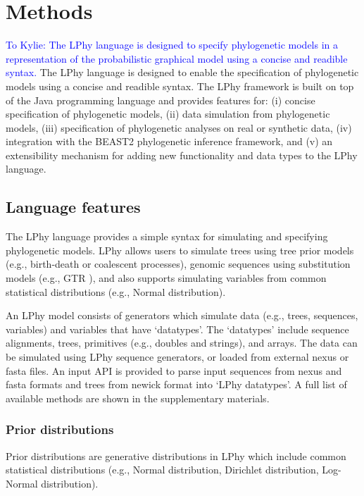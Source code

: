 \documentclass[10pt,letterpaper,table]{article}
\begin{document}
\section{Methods}
\textcolor{blue}{To Kylie: The LPhy language is designed to specify phylogenetic models in a representation of the probabilistic graphical model using a concise and readible syntax.}
The LPhy language is designed to enable the specification of phylogenetic models using a concise and readible syntax.  
The LPhy framework is built on top of the Java programming language and provides features for: 
(i) concise specification of phylogenetic models, (ii) data simulation from phylogenetic models, (iii) specification of phylogenetic analyses on real or synthetic data, (iv) integration with the BEAST2 phylogenetic inference framework, and (v) an extensibility mechanism for adding new functionality and data types to the LPhy language.


\subsection{Language features}
The LPhy language provides a simple syntax for simulating and specifying phylogenetic models.
LPhy allows users to simulate trees using tree prior models (e.g., birth-death or coalescent processes), genomic sequences using substitution models (e.g., GTR \cite{gtr}), and also supports simulating variables from common statistical distributions (e.g., Normal distribution). 

An LPhy model consists of generators which simulate data (e.g., trees, sequences, variables) and variables that have `datatypes'. 
The `datatypes' include sequence alignments, trees, primitives (e.g., doubles and strings), and arrays. 
The data can be simulated using LPhy sequence generators, or loaded from external nexus or fasta files. 
An input API is provided to parse input sequences from nexus and fasta formats and trees from newick format into `LPhy datatypes'. 
A full list of available methods are shown in the supplementary materials.

\subsubsection{Prior distributions}
Prior distributions are generative distributions in LPhy which include common statistical distributions (e.g., Normal distribution, Dirichlet distribution, Log-Normal distribution).  

\end{document}
